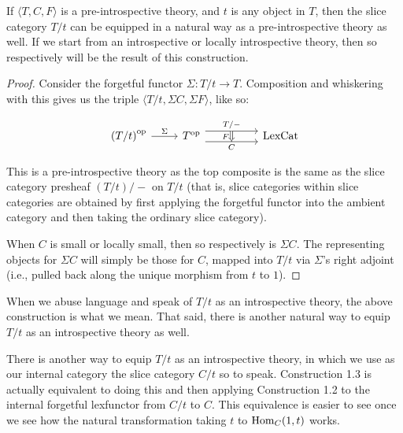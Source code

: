 \begin{construction}
If $\langle T, C, F \rangle$ is a pre-introspective theory, and $t$ is any object in $T$, then the slice category $T/t$ can be equipped in a natural way as a pre-introspective theory as well. If we start from an introspective or locally introspective theory, then so respectively will be the result of this construction.
\end{construction}
\begin{proof}
Consider the forgetful functor $\Sigma : T/t \to T$. Composition and whiskering with this gives us the triple $\langle T/t, \Sigma C, \Sigma F \rangle$, like so:

\[\begin{tikzcd}
	{\op{\left(T/t\right)}} & {\op{T}} && {\LexCat}
	\arrow["{T/-}"{name=0}, from=1-2, to=1-4, shift left=2]
	\arrow["{C}"{name=1, swap}, from=1-2, to=1-4, shift right=2]
	\arrow["{\Sigma}", from=1-1, to=1-2]
	\arrow[Rightarrow, "{F}"', from=0, to=1]
\end{tikzcd}\]

This is a pre-introspective theory as the top composite is the same as the slice category presheaf $(T/t)/-$ on $T/t$ (that is, slice categories within slice categories are obtained by first applying the forgetful functor into the ambient category and then taking the ordinary slice category).

When $C$ is small or locally small, then so respectively is $\Sigma C$. The representing objects for $\Sigma C$ will simply be those for $C$, mapped into $T/t$ via $\Sigma$'s right adjoint (i.e., pulled back along the unique morphism from $t$ to $1$).
\end{proof}

When we abuse language and speak of $T/t$ as an introspective theory, the above construction is what we mean. That said, there is another natural way to equip $T/t$ as an introspective theory as well.

\begin{TODOblock}
There is another way to equip $T/t$ as an introspective theory, in which we use as our internal category the slice category $C/t$ so to speak. Construction 1.3 is actually equivalent to doing this and then applying Construction 1.2 to the internal forgetful lexfunctor from $C/t$ to $C$. This equivalence is easier to see once we see how the natural transformation taking $t$ to $\mathrm{Hom}_C(1, t)$ works.
\end{TODOblock}


